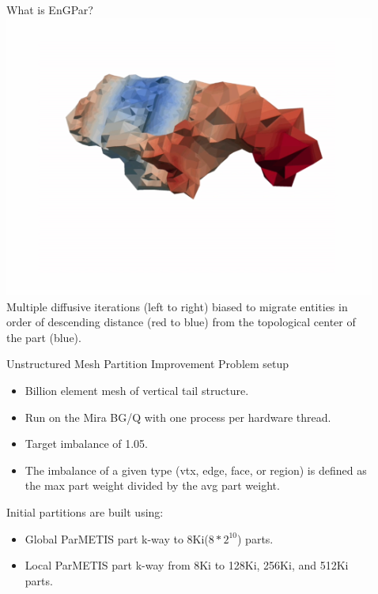 \documentclass[final]{beamer}
\newlength{\sepwid}
\newlength{\onecolwid}
\begin{document}
\begin{frame}[t]
\begin{columns}[t]
\begin{column}{\onecolwid}
\begin{block}{What is EnGPar?}
   \includegraphics[width=.24\textwidth]{../salishan2019/figures/engparDiffusion/5.jpg} \\
   Multiple diffusive iterations (left to right) biased
   to migrate entities in order of descending distance (red to blue) from the
   topological center of the part (blue).
\end{block}

\begin{block}{Unstructured Mesh Partition Improvement}
  \medskip
  Problem setup
  \begin{itemize}
    \item Billion element mesh of vertical tail structure.
    \item Run on the Mira BG/Q with one process per hardware thread.
    \item Target imbalance of 1.05.
    \item The imbalance of a given type (vtx, edge,
      face, or region) is defined as the max part
      weight divided by the avg part weight.
  \end{itemize}
  Initial partitions are built using:
  \begin{itemize}
  \item Global ParMETIS part k-way to 8Ki($8*2^{10}$) parts.
  \item Local ParMETIS part k-way from 8Ki to 128Ki, 256Ki, and 512Ki parts.
  \end{itemize}
\end{block}

\end{column} %

\begin{column}{\sepwid}\end{column} %

\begin{column}{\onecolwid} %



\end{column}
\end{columns}
\end{frame}
\end{document}
